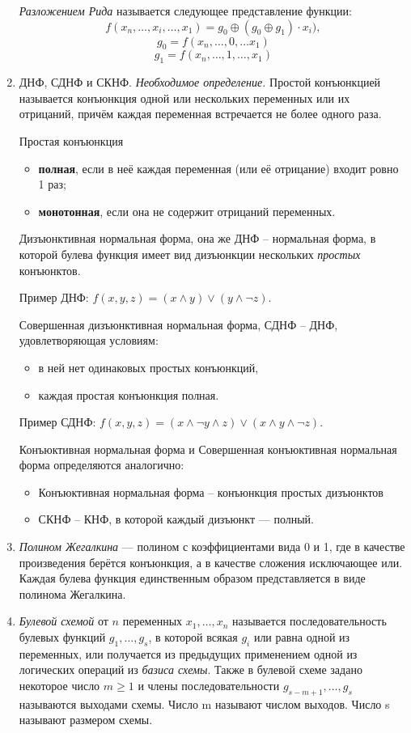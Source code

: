 \documentclass[a4paper,12pt]{article}
\begin{document}
\begin{enumerate}
    \textit{Разложением Рида} называется следующее представление функции:
    \[
    f(x_n, \ldots, x_i, \ldots, x_1) = g_0 \oplus (g_0 \oplus g_1) \cdot x_i),
    \]
    \[
    g_0 = f(x_n, \ldots, 0, \ldots x_1)
    \]
    \[
    g_1 = f(x_n, \ldots, 1, \ldots, x_1)
    \]
     \item ДНФ, СДНФ и СКНФ.
    \textit {Необходимое определение.} Простой конъюнкцией называется конъюнкция одной или нескольких переменных или их отрицаний, причём каждая переменная встречается не более одного раза.
    
    Простая конъюнкция
    \begin{itemize}
        \item \textbf{полная}, если в неё каждая переменная (или её отрицание) входит ровно 1 раз;
        \item \textbf{монотонная}, если она не содержит отрицаний переменных.
    \end{itemize}
    
    Дизъюнктивная нормальная форма, она же ДНФ -- нормальная форма, в которой булева функция имеет вид дизъюнкции нескольких \textit{простых} конъюнктов.
    
    Пример ДНФ: $f(x,y,z) = (x \land y) \lor (y \land \neg {z})$.
    
    Совершенная дизъюнктивная нормальная форма, СДНФ -- ДНФ, удовлетворяющая условиям:
    \begin{itemize}
        \item в ней нет одинаковых простых конъюнкций,
        \item каждая простая конъюнкция полная.
    \end{itemize}
    
    Пример СДНФ: $f(x,y,z) = (x \land \neg {y} \land z) \lor (x \land y \land \neg {z})$.
    
    Конъюктивная нормальная форма и Совершенная конъюктивная нормальная форма определяются аналогично:
    \begin{itemize}
        \item Конъюктивная нормальная форма -- конъюнкция простых дизъюнктов
        \item СКНФ -- КНФ, в которой каждый дизъюнкт --- полный.
    \end{itemize}
    \item \textit{Полином Жегалкина} — полином с коэффициентами вида
    0 и 1, где в качестве произведения берётся конъюнкция, а в качестве сложения
    исключающее или. Каждая булева функция единственным образом представляется в виде полинома Жегалкина.
    \item 
    \textit{Булевой схемой} от $n$ переменных $x_1, \ldots, x_n$ называется последовательность булевых функций $g_1, \ldots, g_s$, в которой всякая $g_i$ или равна одной из переменных,
    или получается из предыдущих применением одной из логических операций из \textit{базиса схемы}. Также в булевой схеме задано некоторое число $m \geq 1$
    и члены последовательности $g_{s-m+1}, \ldots, g_s$ называются выходами схемы.
    Число m называют числом выходов. Число s называют размером схемы.
    

\end{enumerate}
\end{document}
